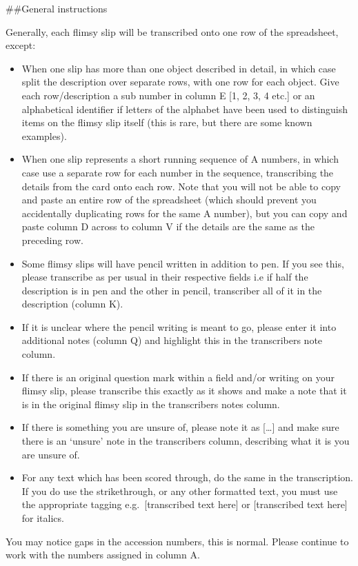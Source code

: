 \documentclass[
  openany]{book}
\providecommand{\tightlist}{%
  \setlength{\itemsep}{0pt}\setlength{\parskip}{0pt}}
\begin{document}
\#\#General instructions

Generally, each flimsy slip will be transcribed onto one row of the spreadsheet, except:

\begin{itemize}
\tightlist
\item
  When one slip has more than one object described in detail, in which case split the description over separate rows, with one row for each object. Give each row/description a sub number in column E {[}1, 2, 3, 4 etc.{]} or an alphabetical identifier if letters of the alphabet have been used to distinguish items on the flimsy slip itself (this is rare, but there are some known examples).
\item
  When one slip represents a short running sequence of A numbers, in which case use a separate row for each number in the sequence, transcribing the details from the card onto each row. Note that you will not be able to copy and paste an entire row of the spreadsheet (which should prevent you accidentally duplicating rows for the same A number), but you can copy and paste column D across to column V if the details are the same as the preceding row.
\item
  Some flimsy slips will have pencil written in addition to pen. If you see this, please transcribe as per usual in their respective fields i.e if half the description is in pen and the other in pencil, transcriber all of it in the description (column K).
\item
  If it is unclear where the pencil writing is meant to go, please enter it into additional notes (column Q) and highlight this in the transcribers note column.
\item
  If there is an original question mark within a field and/or writing on your flimsy slip, please transcribe this exactly as it shows and make a note that it is in the original flimsy slip in the transcribers notes column.
\item
  If there is something you are unsure of, please note it as {[}\ldots{]} and make sure there is an `unsure' note in the transcribers column, describing what it is you are unsure of.
\item
  For any text which has been scored through, do the same in the transcription. If you do use the strikethrough, or any other formatted text, you must use the appropriate tagging e.g.~{[}transcribed text here{]} or {[}transcribed text here{]} for italics.
\end{itemize}

You may notice gaps in the accession numbers, this is normal. Please continue to work with the numbers assigned in column A.
\end{document}
